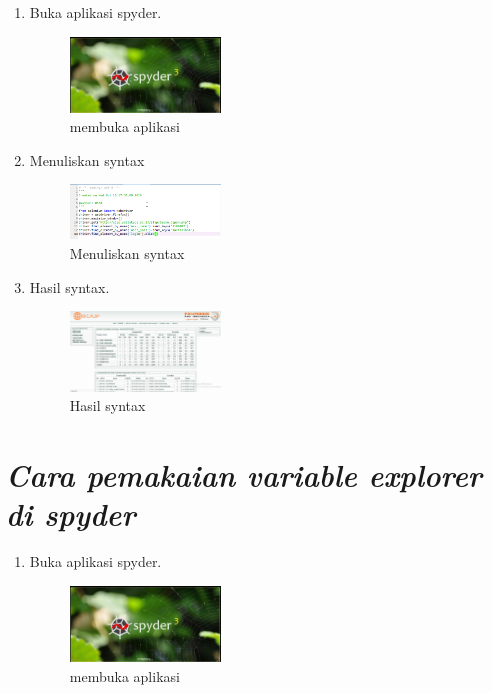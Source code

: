 \begin{enumerate}
\begin{enumerate}
\item Buka aplikasi spyder.
\begin{figure}[hb]
\includegraphics[width=4cm]{figure/pemakaian1.png}
\centering
\caption{membuka aplikasi}
\end{figure}

\item Menuliskan syntax 
\begin{figure}[hb]
\includegraphics[width=4cm]{figure/login.png}
\centering
\caption{Menuliskan syntax}
\end{figure}

\item Hasil syntax.
\begin{figure}[hb]
\includegraphics[width=4cm]{figure/login1.png}
\centering
\caption{Hasil syntax}
\end{figure}

\end{enumerate}

\section*{\textit{ Cara pemakaian variable explorer di spyder }}

\begin{enumerate}

\item Buka aplikasi spyder.
\begin{figure}[hb]
\includegraphics[width=4cm]{figure/pemakaian1.png}
\centering
\caption{membuka aplikasi}
\end{figure}


\end{enumerate}
\end{enumerate}
